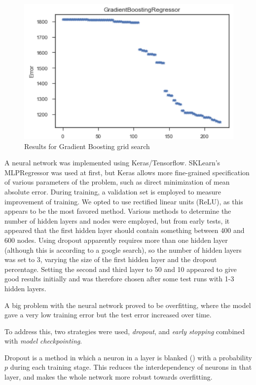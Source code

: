 \documentclass[a4paper]{article}
\begin{document}
\begin{figure}[H]
\centering
\includegraphics{Images/gbr.png}
\caption{Results for Gradient Boosting grid search}
\label{fig:gbr}
\end{figure}

A neural network was implemented using Keras/Tensorflow.  SKLearn's MLPRegressor was used at first, but Keras allows more fine-grained specification of various parameters of the problem, such as direct minimization of mean absolute error.  During training, a validation set is employed to measure improvement of training.  We opted to use rectified linear units (ReLU), as this appears to be the most favored method.  Various methods to determine the number of hidden layers and nodes were employed, but from early tests, it appeared that the first hidden layer should contain something between 400 and 600 nodes.  Using dropout apparently requires more than one hidden layer (although this is according to a google search), so the number of hidden layers was  set to 3, varying the size of the first hidden layer and the dropout percentage.  Setting the second and third layer to 50 and 10 appeared to give good results initially and was therefore chosen after some test runs with 1-3 hidden layers.

A big problem with the neural network proved to be overfitting, where the model gave a very low training error but the test error increased over time.  

To address this, two strategies were used, \textit{dropout}, and \textit{early stopping } combined with \textit{model checkpointing}. 

Dropout is a method in which  a neuron in a layer is blanked () with a probability $p$ during each training stage.  This reduces the interdependency of neurons in that layer, and makes the whole network more robust towards overfitting.
\end{document}
